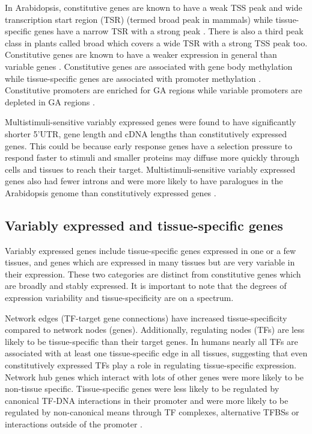 \documentclass[../main.tex]{subfiles}
\begin{document}
In Arabidopsis, constitutive genes are known to have a weak TSS peak and wide transcription start region (TSR) (termed broad peak in mammals) while tissue-specific genes have a narrow TSR with a strong peak \autocite{mortonPairedEndAnalysisTranscription2014}.
There is also a third peak class in plants called broad which covers a wide TSR with a strong TSS peak too.
Constitutive genes are known to have a weaker expression in general than variable genes \autocite{czechowskiGenomeWideIdentificationTesting2005,mortonPairedEndAnalysisTranscription2014}.
Constitutive genes are associated with gene body methylation \autocite{zhangGenomewideHighResolutionMapping2006, takunoBodyMethylatedGenesArabidopsis2012,aceitunoRulesGeneExpression2008} while tissue-specific genes are associated with promoter methylation \autocite{zhangGenomewideHighResolutionMapping2006}.
Constitutive promoters are enriched for GA regions while variable promoters are depleted in GA regions \autocite{yamamotoHeterogeneityArabidopsisCore2009}.

Multistimuli\hyp{}sensitive variably expressed genes were found to have significantly shorter 5'UTR, gene length and cDNA lengths than constitutively expressed genes.
This could be because early response genes have a selection pressure to respond faster to stimuli and smaller proteins may diffuse more quickly through cells and tissues to reach their target.
Multistimuli\hyp{}sensitive variably expressed genes also had fewer introns and were more likely to have paralogues in the Arabidopsis genome than constitutively expressed genes \autocite{waltherRegulatoryCodeTranscriptional2007}.

\subsection{Variably expressed and tissue-specific genes}
\label{chapter1:introduction:variable-tissue-specific-genes}

Variably expressed genes include tissue-specific genes expressed in one or a few tissues, and genes which are expressed in many tissues but are very variable in their expression. These two categories are distinct from constitutive genes which are broadly and stably expressed. It is important to note that the degrees of expression variability and tissue-specificity are on a spectrum.

Network edges (TF-target gene connections) have increased tissue-specificity compared to network nodes (genes). Additionally, regulating nodes (TFs) are less likely to be tissue-specific than their target genes. In humans nearly all TFs are associated with at least one tissue-specific edge in all tissues, suggesting that even constitutively expressed TFs play a role in regulating tissue-specific expression. Network hub genes which interact with lots of other genes were more likely to be non-tissue specific. Tissue-specific genes were less likely to be regulated by canonical TF-DNA interactions in their promoter and were more likely to be regulated by non-canonical means through TF complexes, alternative TFBSs or interactions outside of the promoter \autocite{sonawaneUnderstandingTissueSpecificGene2017}.
\end{document}
